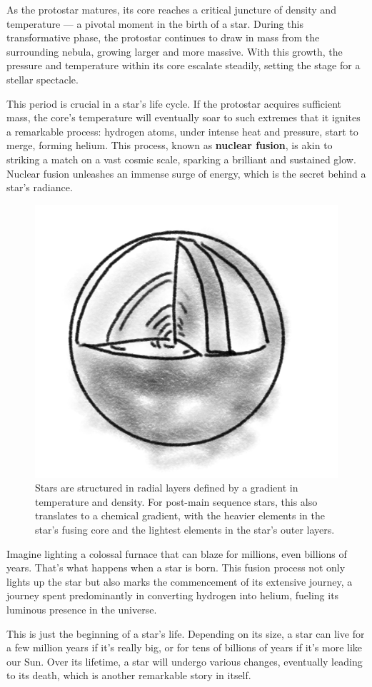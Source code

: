 As the protostar matures, its core reaches a critical juncture of density and temperature — a pivotal moment in the birth of a star. During this transformative phase, the protostar continues to draw in mass from the surrounding nebula, growing larger and more massive. With this growth, the pressure and temperature within its core escalate steadily, setting the stage for a stellar spectacle.

This period is crucial in a star's life cycle. If the protostar acquires sufficient mass, the core's temperature will eventually soar to such extremes that it ignites a remarkable process: hydrogen atoms, under intense heat and pressure, start to merge, forming helium. This process, known as \textbf{nuclear fusion}, is akin to striking a match on a vast cosmic scale, sparking a brilliant and sustained glow. Nuclear fusion unleashes an immense surge of energy, which is the secret behind a star's radiance.

\begin{figure}[h!]
    \centering
    \includegraphics[width=0.4\linewidth]{img/star.png}
    \caption{Stars are structured in radial layers defined by a gradient in temperature and density. For post-main sequence stars, this also translates to a chemical gradient, with the heavier elements in the star's fusing core and the lightest elements in the star's outer layers.}
    \label{fig:star}
\end{figure}

Imagine lighting a colossal furnace that can blaze for millions, even billions of years. That's what happens when a star is born. This fusion process not only lights up the star but also marks the commencement of its extensive journey, a journey spent predominantly in converting hydrogen into helium, fueling its luminous presence in the universe.

This is just the beginning of a star's life. Depending on its size, a star can live for a few million years if it's really big, or for tens of billions of years if it's more like our Sun. Over its lifetime, a star will undergo various changes, eventually leading to its death, which is another remarkable story in itself.


